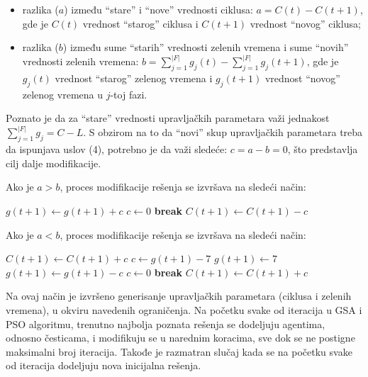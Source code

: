\begin{itemize}
    \item razlika ($a$) između “stare” i “nove” vrednosti ciklusa: $a=C(t)-C(t+1)$, gde je $C(t)$ vrednost “starog”  ciklusa i $C(t+1)$ vrednost “novog” ciklusa;
    \item razlika ($b$) između sume “starih” vrednosti zelenih vremena i sume “novih” vrednosti zelenih vremena: $b = \sum_{j=1}^{|F|} g_j(t) - \sum_{j=1}^{|F|} g_j(t+1)$, gde je $g_j(t)$ vrednost “starog”  zelenog vremena i $g_j(t+1)$ vrednost “novog” zelenog vremena u $j$-toj fazi.
\end{itemize}

Poznato je da za “stare” vrednosti upravljačkih parametara važi jednakost $\sum_{j=1}^{|F|} g_j = C - L$. S obzirom na to da “novi” skup upravljačkih parametara treba da ispunjava uslov (4), potrebno je da važi sledeće: $c = a-b= 0$, što predstavlja cilj dalje modifikacije.

Ako je $a>b$, proces modifikacije rešenja se izvršava na sledeći način:
\begin{algorithmic}
            \State $g(t+1) \leftarrow g(t+1) + c$
            \State $c \leftarrow 0$
            \State \textbf{break}
        \EndIf
    \EndFor
        \State $C(t+1) \leftarrow C(t+1) - c$
    \EndIf
\end{algorithmic}

Ako je $a < b$, proces modifikacije rešenja se izvršava na sledeći način:
\begin{algorithmic}
    \State $C(t+1) \leftarrow C(t+1) + c$
    \Else
                \State $c \leftarrow g(t+1) - 7$
                \State $g(t+1) \leftarrow 7$
            \Else
                \State $g(t+1) \leftarrow g(t+1) - c$
                \State $c \leftarrow 0$
                \State \textbf{break}
            \EndIf
        \EndFor
            \State $C(t+1) \leftarrow C(t+1) + c$
        \EndIf
    \EndIf
\end{algorithmic}

Na ovaj način je izvršeno generisanje upravljačkih parametara (ciklusa i zelenih vremena), u okviru navedenih ograničenja. Na početku svake od iteracija u GSA i PSO algoritmu, trenutno najbolja poznata rešenja se dodeljuju agentima, odnosno česticama, i modifikuju se u narednim koracima, sve dok se ne postigne maksimalni broj iteracija. Takođe je razmatran slučaj kada se na početku svake od iteracija dodeljuju nova inicijalna rešenja.

